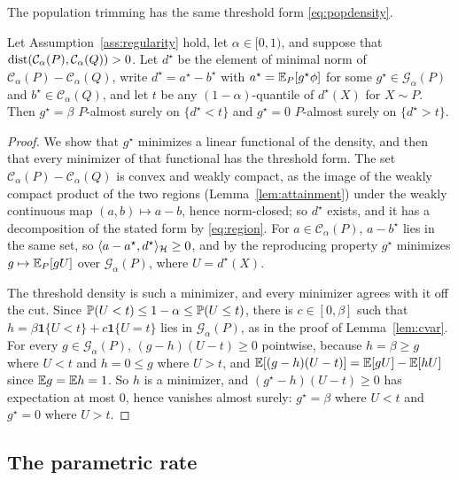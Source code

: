 The population trimming has the same threshold form \eqref{eq:popdensity}.

\begin{lemma}
\label{lem:popthreshold}
Let Assumption~\ref{ass:regularity} hold, let $\alpha\in[0,1)$, and suppose that
$\operatorname{dist}(\mathcal C_\alpha(P),\mathcal C_\alpha(Q))>0$. Let $d^\star$ be the element of minimal norm of
$\mathcal C_\alpha(P)-\mathcal C_\alpha(Q)$, write $d^\star=a^\star-b^\star$ with $a^\star=\mathbb{E}_P[g^\star\phi]$ for some
$g^\star\in\mathcal G_\alpha(P)$ and $b^\star\in\mathcal C_\alpha(Q)$, and let $t$ be any $(1-\alpha)$-quantile of
$d^\star(X)$ for $X\sim P$. Then $g^\star=\beta$ $P$-almost surely on $\{d^\star<t\}$ and $g^\star=0$ $P$-almost surely
on $\{d^\star>t\}$.
\end{lemma}

\begin{proof}
We show that $g^\star$ minimizes a linear functional of the density, and then that every minimizer of that
functional has the threshold form. The set $\mathcal C_\alpha(P)-\mathcal C_\alpha(Q)$ is convex and weakly compact, as the image of the weakly compact
product of the two regions (Lemma~\ref{lem:attainment}) under the weakly continuous map $(a,b)\mapsto a-b$, hence
norm-closed; so $d^\star$ exists, and it has a decomposition of the stated form by \eqref{eq:region}. For
$a\in\mathcal C_\alpha(P)$, $a-b^\star$ lies in the same set, so $\langle a-a^\star,d^\star\rangle_{\mathcal{H}}\ge0$, and by the
reproducing property $g^\star$ minimizes $g\mapsto\mathbb{E}_P[gU]$ over $\mathcal G_\alpha(P)$, where $U=d^\star(X)$.

The threshold density is such a minimizer, and every minimizer agrees with it off the cut. Since $\mathbb{P}(U<t)\le1-\alpha\le\mathbb{P}(U\le t)$, there is
$c\in[0,\beta]$ such that $h=\beta\mathbf 1\{U<t\}+c\mathbf 1\{U=t\}$ lies in $\mathcal G_\alpha(P)$, as in the proof of
Lemma~\ref{lem:cvar}. For every $g\in\mathcal G_\alpha(P)$, $(g-h)(U-t)\ge0$ pointwise, because $h=\beta\ge g$ where $U<t$
and $h=0\le g$ where $U>t$, and $\mathbb{E}[(g-h)(U-t)]=\mathbb{E}[gU]-\mathbb{E}[hU]$ since $\mathbb{E} g=\mathbb{E} h=1$. So $h$ is a minimizer, and $(g^\star-h)(U-t)\ge0$ has
expectation at most $0$, hence vanishes almost surely: $g^\star=\beta$ where $U<t$ and $g^\star=0$ where $U>t$.
\end{proof}

\subsection{The parametric rate}

